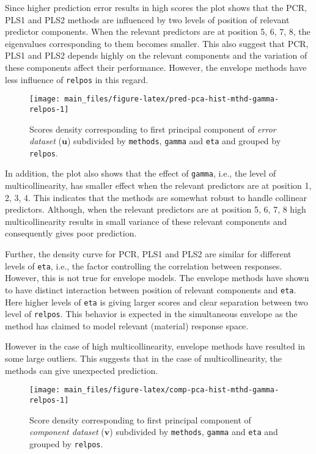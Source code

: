 \documentclass[12pt,3p,authoryear]{elsarticle}
\begin{document}
Since higher prediction error results in high scores the plot shows that
the PCR, PLS1 and PLS2 methods are influenced by two levels of position
of relevant predictor components. When the relevant predictors are at
position 5, 6, 7, 8, the eigenvalues corresponding to them becomes
smaller. This also suggest that PCR, PLS1 and PLS2 depends highly on the
relevant components and the variation of these components affect their
performance. However, the envelope methods have less influence of
\texttt{relpos} in this regard.






\begin{figure}[!htb]
\texttt{[image: main\_files/figure-latex/pred-pca-hist-mthd-gamma-relpos-1]} \caption{Scores density corresponding to first principal
component of \emph{error dataset} (\(\mathbf{u}\)) subdivided by
\texttt{methods}, \texttt{gamma} and \texttt{eta} and grouped by
\texttt{relpos}.}\label{fig:pred-pca-hist-mthd-gamma-relpos}
\end{figure}

In addition, the plot also shows that the effect of \texttt{gamma},
i.e., the level of multicollinearity, has smaller effect when the
relevant predictors are at position 1, 2, 3, 4. This indicates that the
methods are somewhat robust to handle collinear predictors. Although,
when the relevant predictors are at position 5, 6, 7, 8 high
multicollinearity results in small variance of these relevant components
and consequently gives poor prediction.

Further, the density curve for PCR, PLS1 and PLS2 are similar for
different levels of \texttt{eta}, i.e., the factor controlling the
correlation between responses. However, this is not true for envelope
models. The envelope methods have shown to have distinct interaction
between position of relevant components and \texttt{eta}. Here higher
levels of \texttt{eta} is giving larger scores and clear separation
between two level of \texttt{relpos}. This behavior is expected in the
simultaneous envelope as the method has claimed to model relevant
(material) response space.

However in the case of high multicollinearity, envelope methods have
resulted in some large outliers. This suggests that in the case of
multicollinearity, the methods can give unexpected prediction.






\begin{figure}[!htb]
\texttt{[image: main\_files/figure-latex/comp-pca-hist-mthd-gamma-relpos-1]} \caption{Score density corresponding to first principal component
of \emph{component dataset} (\(\mathbf{v}\)) subdivided by
\texttt{methods}, \texttt{gamma} and \texttt{eta} and grouped by
\texttt{relpos}.}\label{fig:comp-pca-hist-mthd-gamma-relpos}
\end{figure}
\end{document}
